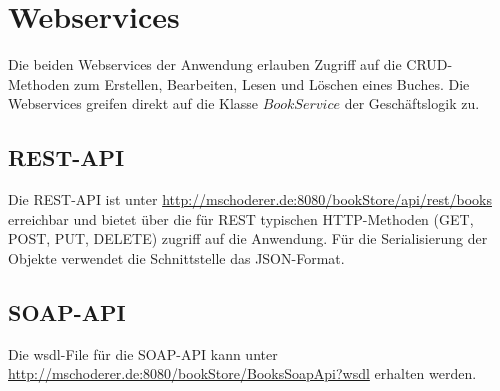 \documentclass[12pt,a4paper]{book}
\begin{document}
		\chapter{Webservices}
		Die beiden Webservices der Anwendung erlauben Zugriff auf die CRUD-Methoden zum Erstellen, Bearbeiten, Lesen und Löschen eines Buches. Die Webservices greifen direkt auf die Klasse $BookService$ der Geschäftslogik zu.
		\section{REST-API}
		Die REST-API ist unter \href{http://mschoderer.de:8080/bookStore/api/rest/books}{http://mschoderer.de:8080/bookStore/api/rest/books} erreichbar und bietet über die für REST typischen HTTP-Methoden (GET, POST, PUT, DELETE) zugriff auf die Anwendung. Für die Serialisierung der Objekte verwendet die Schnittstelle das JSON-Format.
		\section{SOAP-API}
		Die wsdl-File für die SOAP-API kann unter \href{http://mschoderer.de:8080/bookStore/BooksSoapApi?wsdl}{http://mschoderer.de:8080/bookStore/BooksSoapApi?wsdl} erhalten werden.
		
		
\end{document}
